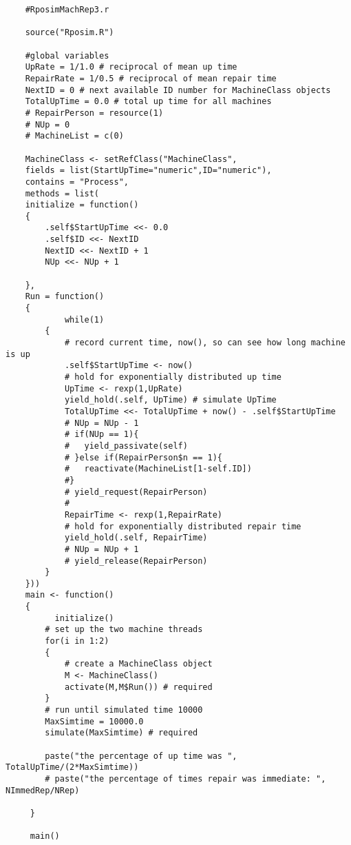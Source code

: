 \documentclass[titlepage]{article}
\begin{document}
\begin{verbatim}
	#RposimMachRep3.r

	source("Rposim.R")

	#global variables
	UpRate = 1/1.0 # reciprocal of mean up time
	RepairRate = 1/0.5 # reciprocal of mean repair time
	NextID = 0 # next available ID number for MachineClass objects
	TotalUpTime = 0.0 # total up time for all machines
	# RepairPerson = resource(1)
	# NUp = 0
	# MachineList = c(0)

	MachineClass <- setRefClass("MachineClass",
	fields = list(StartUpTime="numeric",ID="numeric"),
	contains = "Process",
	methods = list(
	initialize = function()
	{
	    .self$StartUpTime <<- 0.0
	    .self$ID <<- NextID
	    NextID <<- NextID + 1
	    NUp <<- NUp + 1

	},
	Run = function()
	{
			while(1)
	    {  
	        # record current time, now(), so can see how long machine is up
	        .self$StartUpTime <- now()
	        # hold for exponentially distributed up time
	        UpTime <- rexp(1,UpRate)
	        yield_hold(.self, UpTime) # simulate UpTime
			TotalUpTime <<- TotalUpTime + now() - .self$StartUpTime
	        # NUp = NUp - 1
	        # if(NUp == 1){
	        #	yield_passivate(self)
	        # }else if(RepairPerson$n == 1){
	        #	reactivate(MachineList[1-self.ID])
	        #}
	        # yield_request(RepairPerson)
	        # 
	        RepairTime <- rexp(1,RepairRate)
	        # hold for exponentially distributed repair time
	        yield_hold(.self, RepairTime)
	        # NUp = NUp + 1
	        # yield_release(RepairPerson)
	    }
	}))
	main <- function()
	{
		  initialize()
	    # set up the two machine threads
	    for(i in 1:2)
	    {
	        # create a MachineClass object
	        M <- MachineClass()
	        activate(M,M$Run()) # required
	    }
	    # run until simulated time 10000
	    MaxSimtime = 10000.0
	    simulate(MaxSimtime) # required
			
	    paste("the percentage of up time was ", TotalUpTime/(2*MaxSimtime))
	    # paste("the percentage of times repair was immediate: ", NImmedRep/NRep)

	 }
	 
	 main()

\end{verbatim}

\clearpage
\end{document}
